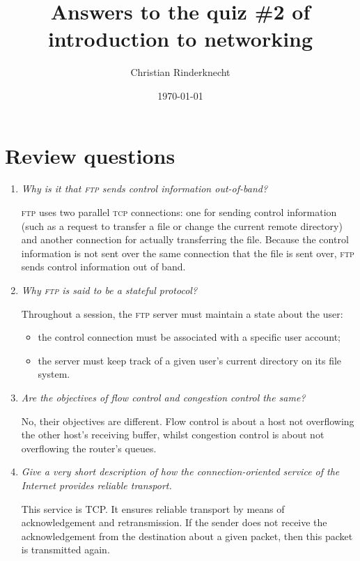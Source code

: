 \documentclass[11pt,a4paper]{article}
\title{Answers to the quiz \#2 of introduction to networking}
\author{Christian Rinderknecht}
\date{\today}
\begin{document}
\maketitle

\section{Review questions}

\begin{enumerate}

  \item \emph{Why is it that \textsc{ftp} sends control information
    out-of-band?}

  \textsc{ftp} uses two parallel \textsc{tcp} connections: one for
  sending control information (such as a request to transfer a file or
  change the current remote directory) and another connection for
  actually transferring the file. Because the control information is
  not sent over the same connection that the file is sent over,
  \textsc{ftp} sends control information out of band.

  \item \emph{Why \textsc{ftp} is said to be a stateful protocol?}

  Throughout a session, the \textsc{ftp} server must maintain a state
  about the user:
  \begin{itemize}

    \item the control connection must be associated with a specific
      user account;

    \item the server must keep track of a given user's current
      directory on its file system.

  \end{itemize}

  \item \emph{Are the objectives of flow control and congestion
    control the same?}

  No, their objectives are different. Flow control is about a host not
  overflowing the other host's receiving buffer, whilst congestion
  control is about not overflowing the router's queues.

  \item \emph{Give a very short description of how the
    connection-oriented service of the Internet provides reliable
    transport.}

  This service is TCP. It ensures reliable transport by means of
  acknowledgement and retransmission. If the sender does not receive
  the acknowledgement from the destination about a given packet, then
  this packet is transmitted again.


\end{enumerate}
\end{document}
